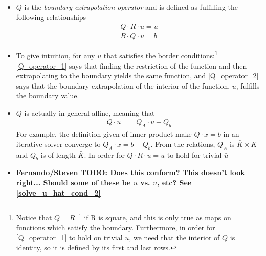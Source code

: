 \documentclass[11pt]{article}
\begin{document}
\begin{itemize}
		\item $Q$ is the \textit{boundary extrapolation operator} and is defined as fulfilling the following relationships
		\begin{align}
		Q \cdot R\cdot\bar{u} = \bar{u}\label{Q_operator_1}\\
		B\cdot Q\cdot u  = b	\label{Q_operator_2}
	\end{align}
	\item To give intuition, for any $\bar{u}$ that satisfies the border conditions:\footnote{Notice that $Q = R^{-1}$ if R is square, and this is only true as maps on functions which satisfy the boundary.  Furthermore, in order for \cref{Q_operator_1} to hold on trivial $u$, we need that the interior of $Q$ is identity, so it is defined by its first and last rows.} \cref{Q_operator_1} says that finding the restriction of the function and then extrapolating to the boundary yields the same function, and \cref{Q_operator_2} says that the boundary extrapolation of the interior of the function, $u$, fulfills the boundary value.
		\item $Q$ is actually in general affine, meaning that
		\begin{align}
			Q\cdot u &= Q_A\cdot u + Q_b\label{Q_Affine}
			\end{align}
			For example, the definition given of inner product make $Q\cdot x=b$ in an iterative solver converge to $Q_A\cdot x = b - Q_b$. From the relations, $Q_A$ is $\bar{K}\times K$ and $Q_b$ is of length $\bar{K}$. In order for $Q\cdot R\cdot u = u$ to hold for trivial $\bar{u}$
			\item \textbf{Fernando/Steven TODO: Does this conform? This doesn't look right...  Should some of these be $u$ vs. $\bar{u}$, etc?  See \cref{solve_u_hat_cond_2}}
		\end{itemize}
\end{document}
